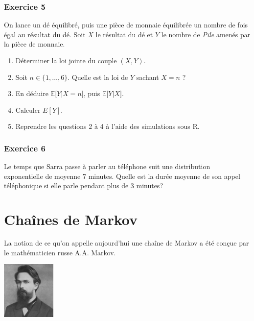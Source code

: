 \documentclass[
]{book}
\theoremstyle{definition}
\theoremstyle{definition}
\theoremstyle{definition}
\theoremstyle{remark}
\begin{document}
\hypertarget{exercice-5}{%
\subsection*{Exercice 5}\label{exercice-5}}

On lance un dé équilibré, puis une pièce de monnaie équilibrée un nombre de fois égal au résultat
du dé. Soit \(X\) le résultat du dé et \(Y\) le nombre de \emph{Pile} amenés par la pièce de monnaie.

\begin{enumerate}
\def\labelenumi{\arabic{enumi}.}
\item
  Déterminer la loi jointe du couple \((X, Y )\).
\item
  Soit \(n \in \{1, \ldots, 6\}\). Quelle est la loi de \(Y\) sachant \(X = n\) ?
\item
  En déduire \(\mathbb{E}\bigl[Y |X = n\bigr]\), puis \(\mathbb{E}\bigl[Y |X\bigr]\).
\item
  Calculer \(E[Y]\).
\item
  Reprendre les questions 2 à 4 à l'aide des simulations sous R.
\end{enumerate}

\hypertarget{exercice-6}{%
\subsection*{Exercice 6}\label{exercice-6}}

Le temps que Sarra passe à parler au téléphone suit une distribution exponentielle de moyenne 7 minutes. Quelle est la durée moyenne de son appel téléphonique si elle parle pendant plus de 3 minutes?

\hypertarget{chauxeenes-de-markov}{%
\chapter{Chaînes de Markov}\label{chauxeenes-de-markov}}

La notion de ce qu'on appelle aujourd'hui une chaîne de Markov a été conçue par le mathématicien russe A.A. Markov.

\includegraphics[width=0.2\textwidth,height=0.2\textheight]{Markov.jpg}
\end{document}
